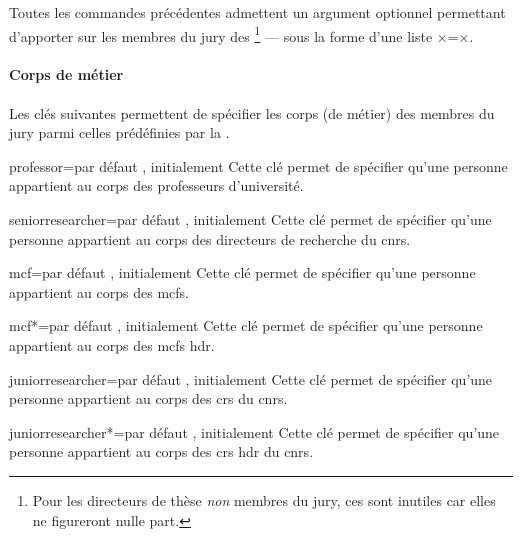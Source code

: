 Toutes les commandes précédentes admettent un argument optionnel permettant
d'apporter sur les membres du jury des \footnote{Pour les
  directeurs de thèse \emph{non} membres du jury, ces  sont
  inutiles car elles ne figureront nulle part.} --- sous la forme d'une liste
×=×.

\paragraph{Corps de métier}
\label{sec:corps}

Les clés suivantes\syntaxeoptions{} permettent de spécifier les corps (de
métier) des membres du jury parmi celles prédéfinies par la \yatcl{}.

\begin{docKey}{professor}{=\textbar{}}{par défaut
    , initialement }
  Cette clé permet de spécifier qu'une personne appartient au corps des
  professeurs d'université.
\end{docKey}
%
\begin{docKey}{seniorresearcher}{=\textbar{}}{par
    défaut , initialement }
  Cette clé permet de spécifier qu'une personne appartient au corps des
  directeurs de recherche du \gls{cnrs}.
\end{docKey}
%
\begin{docKey}{mcf}{=\textbar{}}{par défaut
    , initialement }
  Cette clé permet de spécifier qu'une personne appartient au corps des
  \glspl{mcf}.
\end{docKey}
%
\begin{docKey}{mcf*}{=\textbar{}}{par défaut
    , initialement }
  Cette clé permet de spécifier qu'une personne appartient au corps des
  \glspl{mcf} \gls{hdr}.
\end{docKey}
%
\begin{docKey}{juniorresearcher}{=\textbar{}}{par
    défaut , initialement }
  Cette clé permet de spécifier qu'une personne appartient au corps des
  \glspl{cr} du \gls{cnrs}.
\end{docKey}
%
\begin{docKey}{juniorresearcher*}{=\textbar{}}{par
    défaut , initialement }
  Cette clé permet de spécifier qu'une personne appartient au corps des
  \glspl{cr} \gls{hdr} du \gls{cnrs}.
\end{docKey}
